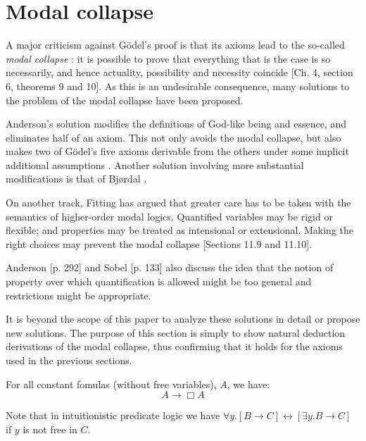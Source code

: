 \documentclass{llncs}
\newcommand{\imp}{\rightarrow}
\newcommand{\biimp}{\leftrightarrow}
\newcommand{\all}{\forall}
\newcommand{\ex}{\exists}
\newcommand{\nec}{\Box} %
\begin{document}
\section{Modal collapse}

A major criticism against G\"odel's proof is that its axioms lead to the so-called \emph{modal collapse} \citep{sobel}: it is possible to prove that everything that is the case is so necessarily, and hence actuality, possibility and necessity coincide \citep{sobel2}[Ch. 4,  section 6, theorems 9 and 10]. As this is an undesirable consequence, many solutions to the problem of the modal collapse have been proposed.

Anderson's solution \citep{citation needed} modifies the definitions of God-like being and essence, and eliminates half of an axiom. This not only avoids the modal collapse, but also makes two of G\"odel's five axioms derivable from the others \citep{hajek} under some implicit additional assumptions \citep{fuhrmann}. Another solution involving more substantial modifications is that of Bj{\o}rdal \citep{bjordal,fuhrmann}. 

On another track, Fitting has argued that greater care has to be taken with the semantics of higher-order modal logics. Quantified variables may be rigid or flexible; and properties may be treated as intensional or extensional. Making the right choices may prevent the modal collapse \citep{fitting}[Sections 11.9 and 11.10].

Anderson \citep{anderson1990}[p. 292] and Sobel \citep{sobel2}[p. 133] also discuss the idea that the notion of property over which quantification is allowed might be too general and restrictions might be appropriate.  


It is beyond the scope of this paper to analyze these solutions in detail or propose new solutions. The purpose of this section is simply to show natural deduction derivations of the modal collapse, thus confirming that it holds for the axioms used in the previous sections.


\begin{theorem}
\label{T5}
For all constant fomulas (without free variables), $A$, we have:
$$
A \imp \nec A
$$
\end{theorem}

Note that in intuitionistic predicate logic we have $\all y.[B \imp C] \biimp [\ex y.B \imp C]$ if $y$ is not free in $C$.
\end{document}
